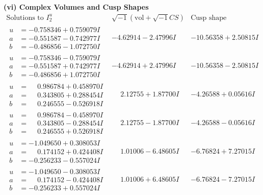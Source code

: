\documentclass[1p]{elsarticle_modified}
\theoremstyle{definition}
\newcommand{\I}{\sqrt{-1}}
\begin{document}
\newpage\flushleft \textbf{(vi) Complex Volumes and Cusp Shapes}
$$\begin{array}{c|c|c}  
\text{Solutions to }I^u_{2}& \I (\text{vol} + \sqrt{-1}CS) & \text{Cusp shape}\\
 \hline 
\begin{aligned}
u &= -0.758346 + 0.759079 I \\
a &= -0.551587 - 0.742977 I \\
b &= -0.486856 - 1.072750 I\end{aligned}
 & -4.62914 - 2.47996 I & -10.56358 + 2.50815 I \\ \hline\begin{aligned}
u &= -0.758346 - 0.759079 I \\
a &= -0.551587 + 0.742977 I \\
b &= -0.486856 + 1.072750 I\end{aligned}
 & -4.62914 + 2.47996 I & -10.56358 - 2.50815 I \\ \hline\begin{aligned}
u &= \phantom{-}0.986784 + 0.458970 I \\
a &= \phantom{-}0.343805 + 0.288454 I \\
b &= \phantom{-}0.246555 - 0.526918 I\end{aligned}
 & \phantom{-}2.12755 + 1.87700 I & -4.26588 + 0.05616 I \\ \hline\begin{aligned}
u &= \phantom{-}0.986784 - 0.458970 I \\
a &= \phantom{-}0.343805 - 0.288454 I \\
b &= \phantom{-}0.246555 + 0.526918 I\end{aligned}
 & \phantom{-}2.12755 - 1.87700 I & -4.26588 - 0.05616 I \\ \hline\begin{aligned}
u &= -1.049650 + 0.308053 I \\
a &= \phantom{-}0.174152 + 0.424408 I \\
b &= -0.256233 - 0.557024 I\end{aligned}
 & \phantom{-}1.01006 - 6.48605 I & -6.76824 + 7.27015 I \\ \hline\begin{aligned}
u &= -1.049650 - 0.308053 I \\
a &= \phantom{-}0.174152 - 0.424408 I \\
b &= -0.256233 + 0.557024 I\end{aligned}
 & \phantom{-}1.01006 + 6.48605 I & -6.76824 - 7.27015 I \\ \hline\begin{aligned}

\end{aligned}
\end{array}$$
\end{document}
